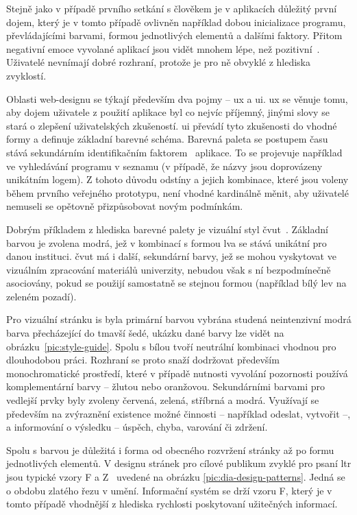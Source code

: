 Stejně jako v případě prvního setkání s člověkem je v aplikacích důležitý první dojem, který je v tomto případě ovlivněn například dobou inicializace programu, převládajícími barvami, formou jednotlivých elementů a dalšími faktory. Přitom negativní emoce vyvolané aplikací jsou vidět mnohem lépe, než pozitivní~\cite{tragicDesign}. Uživatelé nevnímají dobré rozhraní, protože je pro ně obvyklé z hlediska zvyklostí.

Oblasti web-designu se týkají především dva pojmy -- \gls{ux} a \gls{ui}. \gls{ux} se věnuje tomu, aby dojem uživatele z použití aplikace byl co nejvíc příjemný, jinými slovy se stará o zlepšení uživatelských zkušeností. \gls{ui} převádí tyto zkušenosti do vhodné formy a definuje základní barevné schéma. Barevná paleta se postupem času stává sekundárním identifikačním faktorem~\cite{colorTheory} aplikace. To se projevuje například ve vyhledávání programu v seznamu (v případě, že názvy jsou doprovázeny unikátním logem). Z tohoto důvodu odstíny a jejich kombinace, které jsou voleny během prvního veřejného prototypu, není vhodné kardinálně měnit, aby uživatelé nemuseli se opětovně přizpůsobovat novým podmínkám.

Dobrým příkladem z hlediska barevné palety je vizuální styl \gls{čvut}~\cite{cvutStyleGuide}. Základní barvou je zvolena modrá, jež v kombinací s formou lva se stává unikátní pro danou instituci. \gls{čvut} má i další, sekundární barvy, jež se mohou vyskytovat ve vizuálním zpracování materiálů univerzity, nebudou však s ní bezpodmínečně asociovány, pokud se použijí samostatně se stejnou formou (například bílý lev na zeleném pozadí).

Pro vizuální stránku \gls{is} byla primární barvou vybrána studená neintenzivní modrá barva přecházející do tmavší šedé, ukázku dané barvy lze vidět na obrázku~\ref{pic:style-guide}. Spolu s bílou tvoří neutrální kombinaci vhodnou pro dlouhodobou práci. Rozhraní se proto snaží dodržovat především monochromatické prostředí, které v případě nutnosti vyvolání pozornosti používá komplementární barvy -- žlutou nebo oranžovou. Sekundárními barvami pro vedlejší prvky byly zvoleny červená, zelená, stříbrná a modrá. Využívají se především na zvýraznění existence možné činnosti -- například odeslat, vytvořit --, a informování o výsledku -- úspěch, chyba, varování či zdržení.
\newpage

Spolu s barvou je důležitá i forma od obecného rozvržení stránky až po formu jednotlivých elementů. V designu stránek pro cílové publikum zvyklé pro psaní \gls{ltr} jsou typické vzory F a Z~\cite{zfPatterns} uvedené na obrázku \ref{pic:dia-design-patterns}. Jedná se o obdobu zlatého řezu v umění. Informační systém se drží vzoru F, který je v tomto případě vhodnější z hlediska rychlosti poskytovaní užitečných informací.

